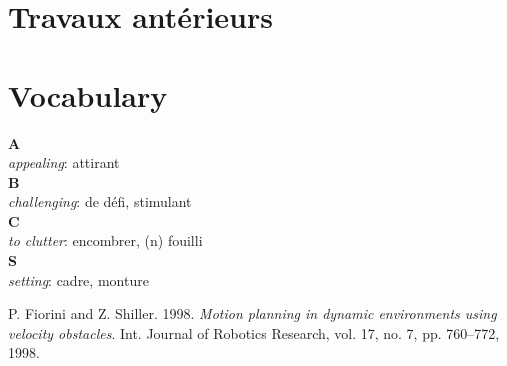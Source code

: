 \documentclass[11pt]{article}
\begin{document}
\section{Travaux antérieurs}


\section{Vocabulary}

\noindent \textbf{A}\\
\textit{appealing}: attirant \\
\textbf{B}\\
\textit{challenging}: de défi, stimulant \\
\textbf{C}\\
\textit{to clutter}: encombrer, (n) fouilli \\
\textbf{S}\\
\textit{setting}: cadre, monture \\


\begin{thebibliography}{2} 

\label{Fiorini and Shiller (1998)}
P. Fiorini and Z. Shiller. 1998.
\textit{Motion planning in dynamic environments using velocity obstacles}.
Int. Journal of Robotics Research, vol. 17, no. 7, pp. 760–772, 1998.

\end{thebibliography}
\end{document}
